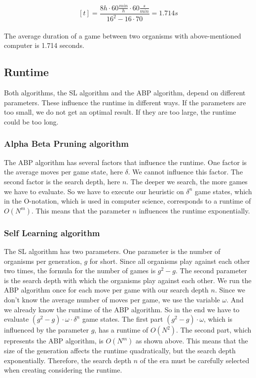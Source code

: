 $$ [t] =  \frac{8h \cdot 60\frac{min}{h} \cdot 60\frac{s}{min}}{16^2 - 16 \cdot 70} = 1.714s$$\\
The average duration of a game between two organisms with above-mentioned computer is 1.714 seconds.

\subsection{Runtime}
Both algorithms, the \ac{SL} algorithm and the \ac{ABP} algorithm, depend on different parameters. These influence the runtime in different ways. If the parameters are too small, we do not get an optimal result. If they are too large, the runtime could be too long.

\subsubsection{Alpha Beta Pruning algorithm} \label{abpruntime}
The \ac{ABP} algorithm has several factors that influence the runtime. One factor is the average moves per game state, here $\delta$. We cannot influence this factor. The second factor is the search depth, here $n$. The deeper we search, the more games we have to evaluate. So we have to execute our heuristic on $\delta^n$ game states, which in the O-notation, which is used in computer science, corresponds to a runtime of $O(N^{m})$. This means that the parameter $n$ influences the runtime exponentially.

\subsubsection{Self Learning algorithm} 
The \ac{SL} algorithm has two parameters. One parameter is the number of organisms per generation, $g$ for short. Since all organisms play against each other two times, the formula for the number of games is $g^2 - g$.  The second parameter is the search depth with which the organisms play against each other. We run the \ac{ABP} algorithm once for each move per game with our search depth $n$. Since we don't know the average number of moves per game, we use the variable $\omega$.  And we already know the runtime of the \ac{ABP} algorithm. So in the end we have to evaluate $(g^2 - g) \cdot \omega \cdot \delta^n$ game states. The first part $(g^2 - g) \cdot \omega$, which is influenced by the parameter $g$, has a runtime of $O(N^2)$. The second part, which represents the \ac{ABP} algorithm, is $O(N^m)$ as shown above. This means that the size of the generation affects the runtime quadratically, but the search depth exponentially. Therefore, the search depth $n$ of the era must be carefully selected when creating considering the runtime.	


